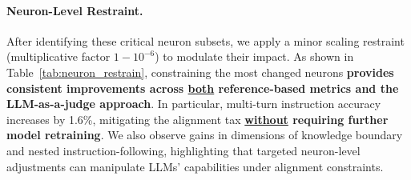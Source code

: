 \paragraph{Neuron-Level Restraint.}
After identifying these critical neuron subsets, we apply a minor scaling restraint (multiplicative factor $1 - 10^{-6}$) to modulate their impact. As shown in Table~\ref{tab:neuron_restrain}, constraining the most changed neurons \textbf{provides consistent improvements across \underline{both} reference-based metrics and the LLM-as-a-judge approach}. 
In particular, multi-turn instruction accuracy increases by 1.6\%, mitigating the alignment tax \textbf{\underline{without} requiring further model retraining}. We also observe gains in dimensions of knowledge boundary and nested instruction-following, highlighting that targeted neuron-level adjustments can manipulate LLMs' capabilities under alignment constraints.

